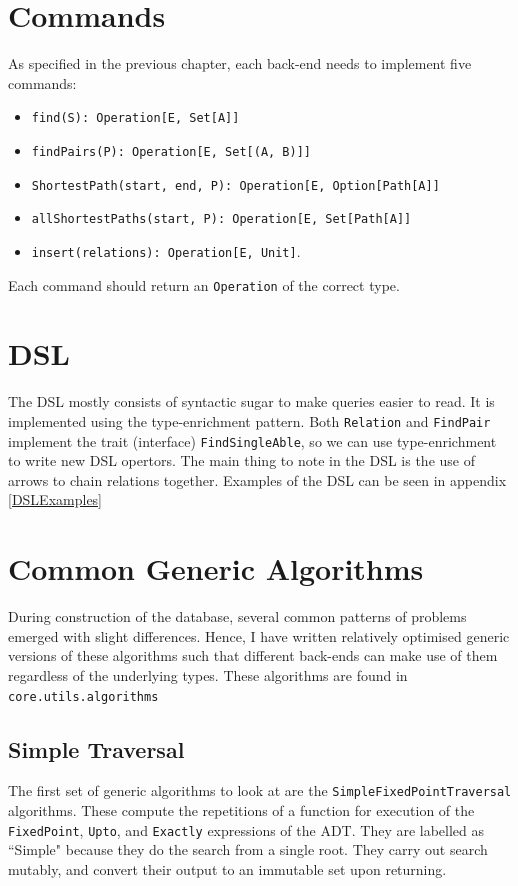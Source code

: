 \documentclass[12pt,a4paper,twoside,openright]{report}
\newcommand\codeName[1]{\texttt{#1}}
\begin{document}
\section{Commands}
As specified in the previous chapter, each back-end needs to implement five commands: 
\begin{itemize}
\item \codeName{find(S): Operation[E, Set[A]]}
\item \codeName{findPairs(P): Operation[E, Set[(A, B)]]}
\item \codeName{ShortestPath(start, end, P): Operation[E, Option[Path[A]]}
\item \codeName{allShortestPaths(start, P): Operation[E, Set[Path[A]]}
\item \codeName{insert(relations): Operation[E, Unit]}.
\end{itemize}
Each command should return an \codeName{Operation} of the correct type.
\section{DSL}
The DSL mostly consists of syntactic sugar to make queries easier to read. It is implemented using the type-enrichment pattern. Both \codeName{Relation} and \codeName{FindPair} implement the trait (interface) \codeName{FindSingleAble}, so we can use type-enrichment to write new DSL opertors. The main thing to note in the DSL is the use of arrows to chain relations together. Examples of the DSL can be seen in appendix \ref{DSLExamples}

\section{Common Generic Algorithms}
During construction of the database, several common patterns of problems emerged with slight differences. Hence, I have written relatively optimised generic versions of these algorithms such that different back-ends can make use of them regardless of the underlying types. These algorithms are found in \codeName{core.utils.algorithms}


	\subsection{Simple Traversal}\label{SimpleFixedPoint}
	The first set of generic algorithms to look at are the \codeName{SimpleFixedPointTraversal} algorithms. These compute the repetitions of a function for execution of the \codeName{FixedPoint}, \codeName{Upto}, and \codeName{Exactly} expressions of the ADT. They are labelled as ``Simple" because they do the search from a single root. They carry out search mutably, and convert their output to an immutable set upon returning.
	
\end{document}
